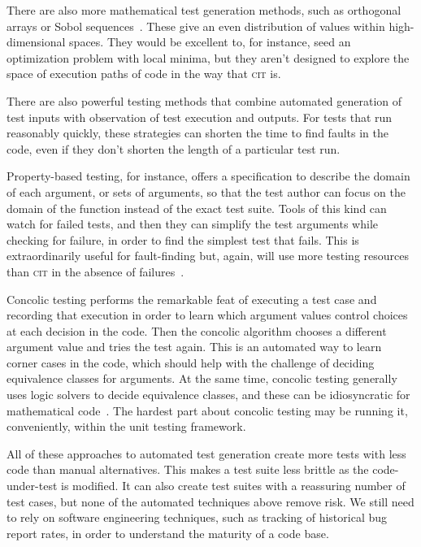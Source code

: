 \documentclass{juliacon}
\newcommand{\cit}{\textsc{cit}\xspace}
\begin{document}
\vskip 6pt
There are also more mathematical test generation methods, such as orthogonal arrays or Sobol sequences~\cite{He2013-th}. These give an even distribution of values within high-dimensional spaces. They would be excellent to, for instance, seed an optimization problem with local minima, but they aren't designed to explore the space of execution paths of code in the way that \cit is.

\vskip 6pt
There are also powerful testing methods that combine automated generation of test inputs with observation of test execution and outputs. For tests that run reasonably quickly, these strategies can shorten the time to find faults in the code, even if they don't shorten the length of a particular test run.

\vskip 6pt
Property-based testing, for instance, offers a specification to describe the domain of each argument, or sets of arguments, so that the test author can focus on the domain of the function instead of the exact test suite. Tools of this kind can watch for failed tests, and then they can simplify the test arguments while checking for failure, in order to find the simplest test that fails. This is extraordinarily useful for fault-finding but, again, will use more testing resources than \cit in the absence of failures~\cite{loscher2018automating}.

\vskip 6pt
Concolic testing performs the remarkable feat of executing a test case and recording that execution in order to learn which argument values control choices at each decision in the code. Then the concolic algorithm chooses a different argument value and tries the test again. This is an automated way to learn corner cases in the code, which should help with the challenge of deciding equivalence classes for arguments. At the same time, concolic testing generally uses logic solvers to decide equivalence classes, and these can be idiosyncratic for mathematical code~\cite{King1976-jt,Wang2018-xh}. The hardest part about concolic testing may be running it, conveniently, within the unit testing framework.

\vskip 6pt
All of these approaches to automated test generation create more tests with less code than manual alternatives. This makes a test suite less brittle as the code-under-test is modified. It can also create test suites with a reassuring number of test cases, but none of the automated techniques above remove risk. We still need to rely on software engineering techniques, such as tracking of historical bug report rates, in order to understand the maturity of a code base.
\end{document}
